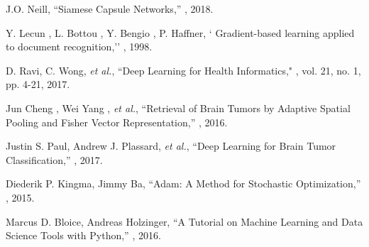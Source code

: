 \documentclass{article}
\begin{document}
\begin{thebibliography}{10}
J.O. Neill,
\newblock ``Siamese Capsule Networks,''
, 2018.

 Y. Lecun , L. Bottou , Y. Bengio , P. Haffner,
\newblock ` Gradient-based learning applied to document recognition,''
, 1998.

D. Ravi, C. Wong, {\em et al.},
\newblock ``Deep Learning for Health Informatics,"
, vol. 21, no. 1, pp. 4-21, 2017.


Jun Cheng , Wei Yang , \textit{et al.},
\newblock ``Retrieval of Brain Tumors by Adaptive Spatial Pooling and Fisher Vector Representation,''
, 2016.

Justin S. Paul, Andrew J. Plassard, \textit{et al.},
\newblock ``Deep Learning for Brain Tumor Classification,''
, 2017.

Diederik P. Kingma, Jimmy Ba,
\newblock ``Adam: A Method for Stochastic Optimization,''
, 2015.

Marcus D. Bloice, Andreas Holzinger,
\newblock ``A Tutorial on Machine Learning and Data Science Tools with Python,''
, 2016.\\


\end{thebibliography}
\end{document}
